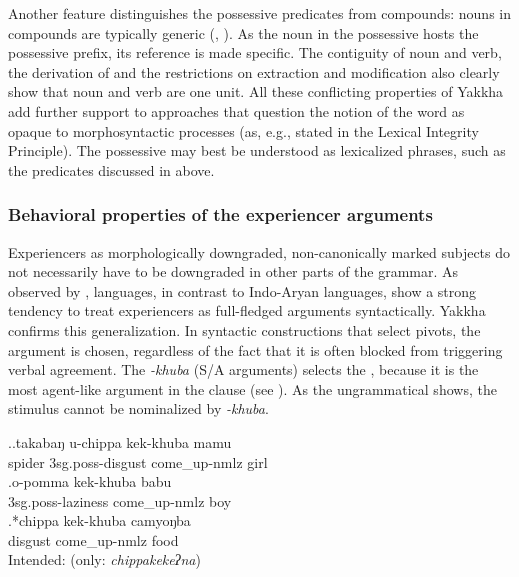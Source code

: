 \largerpage 
Another feature distinguishes the possessive  predicates from compounds: nouns in compounds are typically generic (\citealt[66]{Fabb2001Compounding}, \citealt[156]{Haspelmath2002Understanding}). As the noun in the possessive  hosts the possessive prefix, its reference is made specific. The contiguity of noun and verb, the derivation of  and the restrictions on extraction and modification also clearly show that noun and verb are one unit. All these conflicting properties of Yakkha add further support to approaches that question the notion of the word as opaque to morphosyntactic processes (as, e.g., stated in the Lexical Integrity Principle). The possessive  may best be understood as lexicalized phrases, such as  the predicates discussed in  above.  


\subsubsection{Behavioral properties of the experiencer arguments}\label{poss-e4}

Experiencers as morphologically downgraded, non-canonically marked subjects do not necessarily have to be downgraded in other parts of the grammar. As observed  by \citet{Bickel2004The-syntax},  languages, in contrast to Indo-Aryan languages, show a strong tendency to treat  experiencers as full-fledged arguments  syntactically. Yakkha confirms this generalization. In syntactic constructions that select pivots, the  argument is chosen, regardless of the fact that  it is often blocked from triggering verbal agreement. The  \emph{-khuba} (S/A arguments) selects the , because it is the most agent-like argument in the clause (see \Next). As the ungrammatical \Next[c] shows, the stimulus cannot be nominalized by \emph{-khuba}.


 \ex.\ag.takabaŋ u-chippa kek-khuba mamu\\
spider {\sc 3sg.poss-}disgust come\_up{\sc -nmlz} girl\\
\bg.o-pomma kek-khuba babu\\
{\sc 3sg.poss-}laziness come\_up{\sc -nmlz} boy\\
\bg.*chippa kek-khuba camyoŋba \\
disgust come\_up{\sc -nmlz} food \\
Intended:  (only: \emph{chippakekeʔna})

